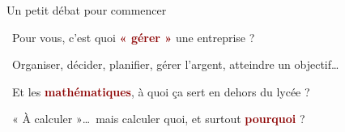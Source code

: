 \documentclass[aspectratio=169,11pt]{beamer}
\newcommand{\important}[1]{\textcolor{DarkRed}{\textbf{#1}}}
\begin{document}
	\begin{frame}{Un petit débat pour commencer}
		
		\begin{definitionbox}
			\faComments\ Pour vous, c'est quoi \important{« gérer »} une entreprise ?
		\end{definitionbox}
		
		\pause
		\begin{applicationbox}
			\faCheckCircle\ Organiser, décider, planifier, gérer l'argent, atteindre un objectif\dots
		\end{applicationbox}
		
		\vspace{0.35cm}
		
		\begin{definitionbox}
			\faComments\ Et les \important{mathématiques}, à quoi ça sert en dehors du lycée ?
		\end{definitionbox}
		
		\pause
		\begin{applicationbox}
			\faCheckCircle\ « À calculer »\dots\ mais calculer quoi, et surtout \important{pourquoi} ?
		\end{applicationbox}
		
	\end{frame}
	
\end{document}
